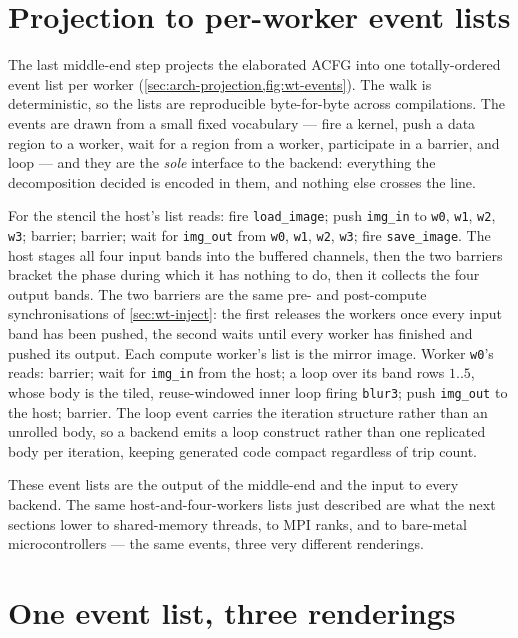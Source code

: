 

\section{Projection to per-worker event lists}\label{sec:wt-events}

The last middle-end step projects the elaborated ACFG into one totally-ordered
event list per worker (\cref{sec:arch-projection,fig:wt-events}). The walk is
deterministic, so the lists are reproducible byte-for-byte across compilations. The
events are drawn from a small fixed vocabulary --- fire a kernel, push a data region
to a worker, wait for a region from a worker, participate in a barrier, and loop ---
and they are the \emph{sole} interface to the backend: everything the decomposition
decided is encoded in them, and nothing else crosses the line.

For the stencil the host's list reads: fire \texttt{load\_image}; push
\texttt{img\_in} to \texttt{w0}, \texttt{w1}, \texttt{w2}, \texttt{w3}; barrier;
barrier; wait for \texttt{img\_out} from \texttt{w0}, \texttt{w1}, \texttt{w2},
\texttt{w3}; fire \texttt{save\_image}. The host stages all four input bands into
the buffered channels, then the two barriers bracket the phase during which it has
nothing to do, then it collects the four output bands. The two barriers are the
same pre- and post-compute synchronisations of \cref{sec:wt-inject}: the first
releases the workers once every input band has been pushed, the second waits until
every worker has finished and pushed its output. Each compute worker's list is the
mirror image. Worker \texttt{w0}'s reads: barrier; wait for \texttt{img\_in} from
the host; a loop over its band rows $1..5$, whose body is the tiled, reuse-windowed
inner loop firing \texttt{blur3}; push \texttt{img\_out} to the host; barrier. The
loop event carries the iteration structure rather than an unrolled body, so a
backend emits a loop construct rather than one replicated body per iteration,
keeping generated code compact regardless of trip count.



These event lists are the output of the middle-end and the input to every backend.
The same host-and-four-workers lists just described are what the next sections lower
to shared-memory threads, to MPI ranks, and to bare-metal microcontrollers --- the
same events, three very different renderings.

\section{One event list, three renderings}\label{sec:wt-lowering}

